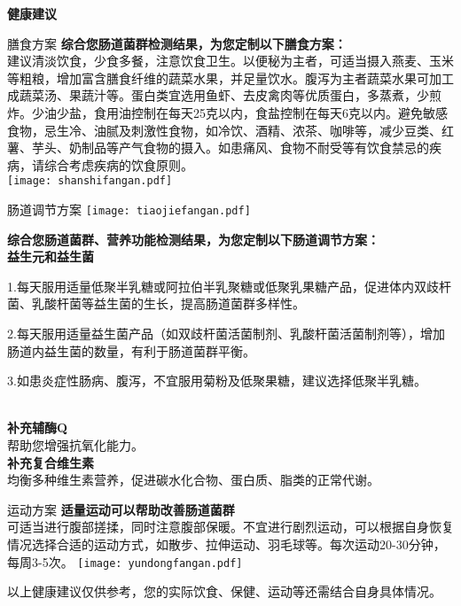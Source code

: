 

\usepackage{graphicx}
\graphicspath{{cores/}}



\vspace*{6mm}
\setlength{\arrayrulewidth}{1pt}
\fontsize{9.3pt}{11pt}\selectfont
\color{gray2}

\centerline{\bf\sanhao 健康建议}

\vspace*{2mm}

\begin{LRaside}[.20]{膳食方案}
{\bf *综合您肠道菌群检测结果，为您定制以下膳食方案：}\\
{\indent 建议清淡饮食，少食多餐，注意饮食卫生。以便秘为主者，可适当摄入燕麦、玉米等粗粮，增加富含膳食纤维的蔬菜水果，并足量饮水。腹泻为主者蔬菜水果可加工成蔬菜汤、果蔬汁等。蛋白类宜选用鱼虾、去皮禽肉等优质蛋白，多蒸煮，少煎炸。少油少盐，食用油控制在每天25克以内，食盐控制在每天6克以内。避免敏感食物，忌生冷、油腻及刺激性食物，如冷饮、酒精、浓茶、咖啡等，减少豆类、红薯、芋头、奶制品等产气食物的摄入。如患痛风、食物不耐受等有饮食禁忌的疾病，请综合考虑疾病的饮食原则。}\\
\asidebreak %
\noindent
\texttt{[image: shanshifangan.pdf]}

\end{LRaside}


\begin{LRaside}[.70]{肠道调节方案}
\noindent
\texttt{[image: tiaojiefangan.pdf]}

\asidebreak %
{\bf *综合您肠道菌群、营养功能检测结果，为您定制以下肠道调节方案：}\\
{\bf 益生元和益生菌}\\{\indent 1.每天服用适量低聚半乳糖或阿拉伯半乳聚糖或低聚乳果糖产品，促进体内双歧杆菌、乳酸杆菌等益生菌的生长，提高肠道菌群多样性。

2.每天服用适量益生菌产品（如双歧杆菌活菌制剂、乳酸杆菌活菌制剂等），增加肠道内益生菌的数量，有利于肠道菌群平衡。

3.如患炎症性肠病、腹泻，不宜服用菊粉及低聚果糖，建议选择低聚半乳糖。}\\
{\bf 补充辅酶Q}\\{\indent 帮助您增强抗氧化能力。}\\
{\bf 补充复合维生素}\\{\indent 均衡多种维生素营养，促进碳水化合物、蛋白质、脂类的正常代谢。}\\
\end{LRaside}

\begin{LRaside}[.20]{运动方案}
{\bf *适量运动可以帮助改善肠道菌群}\\
{\indent 可适当进行腹部搓揉，同时注意腹部保暖。不宜进行剧烈运动，可以根据自身恢复情况选择合适的运动方式，如散步、拉伸运动、羽毛球等。每次运动20-30分钟，每周3-5次。}
\asidebreak %
\noindent
\texttt{[image: yundongfangan.pdf]}

\end{LRaside}

{\noindent\qihao *以上健康建议仅供参考，您的实际饮食、保健、运动等还需结合自身具体情况。}


